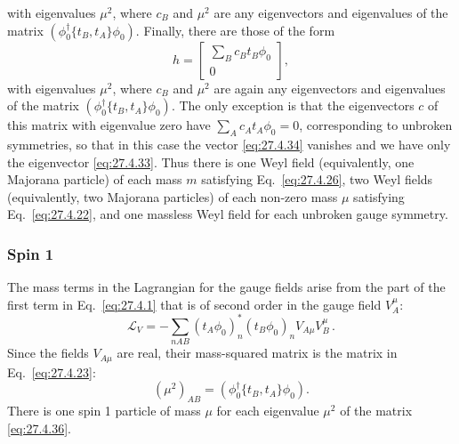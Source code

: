 with eigenvalues \(\mu^2\), where \(c_B\) and \(\mu^2\) are any eigenvectors
and eigenvalues of the matrix
\(\left(\phi_0^\dagger\{t_B,t_A\}\phi_0\right)\). Finally, there are those
of the form
\begin{equation}
  h=
  \begin{bmatrix}
    \sum_Bc_Bt_B\phi_0\\
    0
  \end{bmatrix},
  \tag{27.4.34}\label{eq:27.4.34}
\end{equation}
with eigenvalues \(\mu^2\), where \(c_B\) and \(\mu^2\) are again any
eigenvectors and eigenvalues of the matrix
\(\left(\phi_0^\dagger\{t_B,t_A\}\phi_0\right)\). The only exception is
that the eigenvectors \(c\) of this matrix with eigenvalue zero have
\(\sum_Ac_At_A\phi_0=0\), corresponding to unbroken symmetries, so that in
this case the vector \eqref{eq:27.4.34} vanishes and we have only the
eigenvector \eqref{eq:27.4.33}. Thus there is one Weyl field (equivalently,
one Majorana particle) of each mass \(m\) satisfying
Eq.~\eqref{eq:27.4.26}, two Weyl fields (equivalently, two Majorana
particles) of each non-zero mass \(\mu\) satisfying
Eq.~\eqref{eq:27.4.22}, and one massless Weyl field for each unbroken gauge
symmetry.

\subsubsection*{Spin 1}

The mass terms in the Lagrangian for the gauge fields arise from the part of
the first term in Eq.~\eqref{eq:27.4.1} that is of second order in the gauge
field \(V_A^\mu\):
\begin{equation}
  \mathcal{L}_V
  =-\sum_{nAB}(t_A\phi_0)_n^*(t_B\phi_0)_nV_{A\mu}V_B^\mu\,.
  \tag{27.4.35}\label{eq:27.4.35}
\end{equation}
Since the fields \(V_{A\mu}\) are real, their mass-squared matrix is the
matrix in Eq.~\eqref{eq:27.4.23}:
\begin{equation}
  (\mu^2)_{AB}
  =\left(\phi_0^\dagger\{t_B,t_A\}\phi_0\right).
  \tag{27.4.36}\label{eq:27.4.36}
\end{equation}
There is one spin 1 particle of mass \(\mu\) for each eigenvalue \(\mu^2\) of
the matrix \eqref{eq:27.4.36}.

